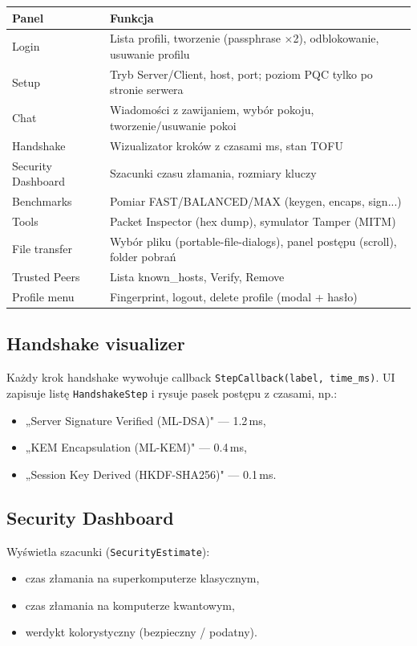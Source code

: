\documentclass[12pt,a4paper]{article}
\begin{document}
\begin{table}[H]
\centering
\small
\begin{tabular}{@{}p{3.5cm}p{10cm}@{}}
\toprule
\textbf{Panel} & \textbf{Funkcja} \\
\midrule
Login & Lista profili, tworzenie (passphrase $\times$2), odblokowanie, usuwanie profilu \\
Setup & Tryb Server/Client, host, port; poziom PQC tylko po stronie serwera \\
Chat & Wiadomości z zawijaniem, wybór pokoju, tworzenie/usuwanie pokoi \\
Handshake & Wizualizator kroków z czasami ms, stan TOFU \\
Security Dashboard & Szacunki czasu złamania, rozmiary kluczy \\
Benchmarks & Pomiar FAST/BALANCED/MAX (keygen, encaps, sign...) \\
Tools & Packet Inspector (hex dump), symulator Tamper (MITM) \\
File transfer & Wybór pliku (portable-file-dialogs), panel postępu (scroll), folder pobrań \\
Trusted Peers & Lista known\_hosts, Verify, Remove \\
Profile menu & Fingerprint, logout, delete profile (modal + hasło) \\
\bottomrule
\end{tabular}
\end{table}

\subsection{Handshake visualizer}

Każdy krok handshake wywołuje callback \texttt{StepCallback(label, time\_ms)}. UI zapisuje listę \texttt{HandshakeStep} i rysuje pasek postępu z czasami, np.:
\begin{itemize}
    \item „Server Signature Verified (ML-DSA)" --- 1.2\,ms,
    \item „KEM Encapsulation (ML-KEM)" --- 0.4\,ms,
    \item „Session Key Derived (HKDF-SHA256)" --- 0.1\,ms.
\end{itemize}

\subsection{Security Dashboard}

Wyświetla szacunki (\texttt{SecurityEstimate}):
\begin{itemize}
    \item czas złamania na superkomputerze klasycznym,
    \item czas złamania na komputerze kwantowym,
    \item werdykt kolorystyczny (bezpieczny / podatny).
\end{itemize}
\end{document}
